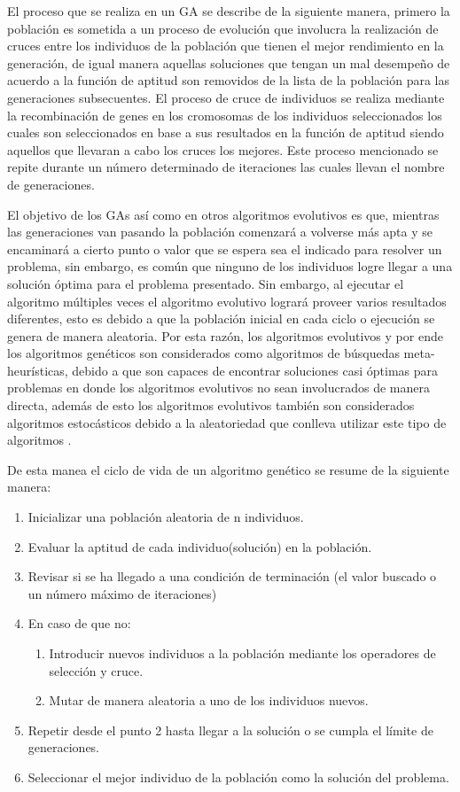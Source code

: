 El proceso que se realiza en un GA se describe de la siguiente manera, primero
la población es sometida a un proceso de evolución que involucra la realización
de cruces entre los individuos de la población que tienen el mejor rendimiento
en la generación, de igual manera aquellas soluciones que tengan un mal
desempeño de acuerdo a la función de aptitud son removidos de la lista de la
población para las generaciones subsecuentes. El proceso de cruce de individuos
se realiza mediante la recombinación de genes en los cromosomas de los
individuos seleccionados los cuales son seleccionados en base a sus resultados
en la función de aptitud siendo aquellos que llevaran a cabo los cruces los
mejores. Este proceso mencionado se repite durante un número determinado de
iteraciones las cuales llevan el nombre de generaciones.

El objetivo de los GAs así como en otros algoritmos evolutivos es que, mientras
las generaciones van pasando la población comenzará a volverse más apta y se
encaminará a cierto punto o valor que se espera sea el indicado para resolver un
problema, sin embargo, es común que ninguno de los individuos logre llegar a una
solución óptima para el problema presentado. Sin embargo, al ejecutar el
algoritmo múltiples veces el algoritmo evolutivo logrará proveer varios
resultados diferentes, esto es debido a que la población inicial en cada ciclo o
ejecución se genera de manera aleatoria. Por esta razón, los algoritmos
evolutivos y por ende los algoritmos genéticos son considerados como algoritmos
de búsquedas meta-heurísticas, debido a que son capaces de encontrar soluciones
casi óptimas para problemas en donde los algoritmos evolutivos no sean
involucrados de manera directa, además de esto los algoritmos evolutivos también
son considerados algoritmos estocásticos debido a la aleatoriedad que conlleva
utilizar este tipo de algoritmos \cite{Harik1999}.

De esta manea el ciclo de vida de un algoritmo genético se resume de la
siguiente manera: 

\begin{enumerate}
    \item Inicializar una población aleatoria de n individuos.
    \item Evaluar la aptitud de cada individuo(solución) en la población.
    \item Revisar si se ha llegado a una condición de terminación 
          (el valor buscado o un número máximo de iteraciones)
    \item En caso de que no:
    \begin{enumerate}
        \item Introducir nuevos individuos a la población mediante los
        operadores de selección y cruce.
        \item Mutar de manera aleatoria a uno de los individuos nuevos.
    \end{enumerate} 
    \item Repetir desde el punto 2 hasta llegar a la solución o se cumpla el
    límite de generaciones.
    \item Seleccionar el mejor individuo de la población como la solución del problema.
\end{enumerate}

